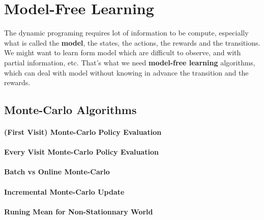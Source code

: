 

\section{Model-Free Learning} %
	\label{sec:model_free_learning}

	The dynamic programing requires lot of information to be compute, especially what is called the \textbf{model}, the states, the actions, the rewards and the transitions. We might want to learn form model which are difficult to observe, and with partial information, etc. That's what we need \textbf{model-free learning} algorithms, which can deal with model without knowing in advance the transition and the rewards. 


	\subsection{Monte-Carlo Algorithms} %
		\label{sub:monte_carlo_algorithm}

		\paragraph*{(First Visit) Monte-Carlo Policy Evaluation}

		\paragraph*{Every Visit Monte-Carlo Policy Evaluation}


		\paragraph*{Batch vs Online Monte-Carlo}

		\paragraph*{Incremental Monte-Carlo Update}

		\paragraph*{Runing Mean for Non-Stationnary World}

